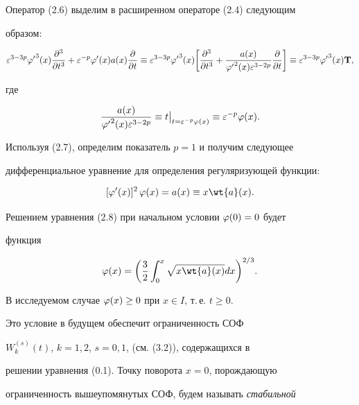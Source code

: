 Оператор (2.6) выделим в расширенном операторе (2.4) следующим


образом:


$$


\e^{3-3p} {\f'}^3 (x) \frac{\d^3}{\d t^3} + \e^{-p} \f'(x) a(x)


\frac{\d}{\d t} \equiv \e^{3-3p} {\f'}^3 (x) \bigg[ \frac{\d^3}{\d t^3}


+ \frac{a(x)}{{\f'}^2 (x) \e^{3-2p}} \frac{\d}{\d t} \bigg] \equiv


\e^{3-3p} {\f'}^3 (x) \bold{T},


$$


где


\begin{equation}


\frac{a(x)}{{\f'}^2 (x) \e^{3-2p}}


\equiv t \big|_{t=\e^{-p} \f(x)} \equiv \e^{-p} \f (x). 


\end{equation}





Используя (2.7), определим показатель $p=1$ и получим следующее


дифференциальное уравнение для определения регуляризующей функции:


\begin{equation}


[{\f'} (x)]^2 \, \f (x) = a(x) \equiv x \wt{a} (x). 


\end{equation}


Решением уравнения (2.8) при начальном условии $\varphi (0) = 0$ будет


функция


$$


\f (x) = \biggl(\frac{3}{2} \int_0^x \sqrt{x \wt{a}


(x)} d x {\biggr)}^{2/3}. 


$$





В исследуемом случае $\varphi (x) \geq 0$ при $x \in I$, т.\,е. $t \geq0$.


Это условие в будущем обеспечит ограниченность СОФ


$W_k^{(s)} (t)$, $k = 1,2$, $s = 0, 1$, (см. (3.2)), содержащихся в


решении уравнения (0.1). Точку поворота $x=0$, порождающую


ограниченность вышеупомянутых СОФ, будем называть {\it стабильной}



